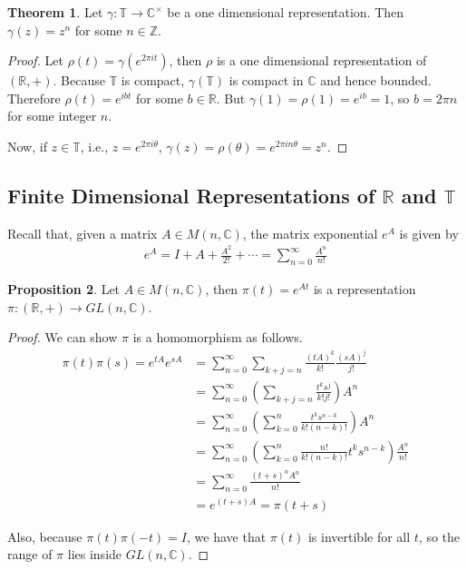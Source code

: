 \documentclass[12pt, a4paper]{article}
\theoremstyle{definition}
\newtheorem{theorem}{Theorem}[section]
\newtheorem{prop}[theorem]{Proposition}
\begin{document}
\begin{theorem}
Let $\gamma : \mathbb{T} \to \mathbb{C}^\times$ be a one dimensional representation. Then $\gamma(z) = z^n$ for some $n \in \mathbb{Z}$.
\end{theorem}
\begin{proof}
Let $\rho(t) = \gamma(e^{2 \pi i t})$, then $\rho$ is a one dimensional representation of $(\mathbb{R}, +)$. Because $\mathbb{T}$ is compact, $\gamma(\mathbb{T})$ is compact in $\mathbb{C}$ and hence bounded. Therefore $\rho(t) = e^{ibt}$ for some $b \in \mathbb{R}$. But $\gamma(1) = \rho(1) = e^{ib} = 1$, so $b = 2 \pi n$ for some integer $n$.

Now, if $z \in \mathbb{T}$, i.e., $z = e^{2 \pi i \theta}$, $\gamma(z) = \rho(\theta) = e^{2 \pi i n \theta} = z^n$.
\end{proof}

\subsection{Finite Dimensional Representations of $\mathbb{R}$ and $\mathbb{T}$}

Recall that, given a matrix $A \in M(n, \mathbb{C})$, the matrix exponential $e^A$ is given by
\begin{align*}
  e^A = I + A + \frac{A^2}{2!} + \cdots = \sum_{n=0}^\infty \frac{A^n}{n!}
\end{align*}

\begin{prop}
Let $A \in M(n, \mathbb{C})$, then $\pi(t) = e^{At}$ is a representation $\pi : (\mathbb{R}, +) \to GL(n, \mathbb{C})$.
\end{prop}
\begin{proof}
We can show $\pi$ is a homomorphism as follows.
\begin{align*}
  \pi(t)\pi(s) = e^{tA}e^{sA} &= \sum_{n=0}^\infty \sum_{k + j = n} \frac{(tA)^k}{k!} \frac{(sA)^j}{j!} \\
  &= \sum_{n=0}^\infty \left( \sum_{k+j=n} \frac{t^k s^j}{k! j!}  \right) A^n \\
  &= \sum_{n=0}^\infty \left( \sum_{k=0}^n \frac{t^k s^{n-k}}{k! (n-k)!}  \right) A^n \\
  &= \sum_{n=0}^\infty \left( \sum_{k=0}^n \frac{n!}{k! (n-k)!} t^k s^{n-k}  \right) \frac{A^n}{n!} \\
  &= \sum_{n=0}^\infty \frac{(t+s)^n A^n}{n!} \\
  &= e^{(t+s)A} = \pi(t+s)
\end{align*}

Also, because $\pi(t)\pi(-t) = I$, we have that $\pi(t)$ is invertible for all $t$, so the range of $\pi$ lies inside $GL(n, \mathbb{C})$.
\end{proof}
\end{document}
